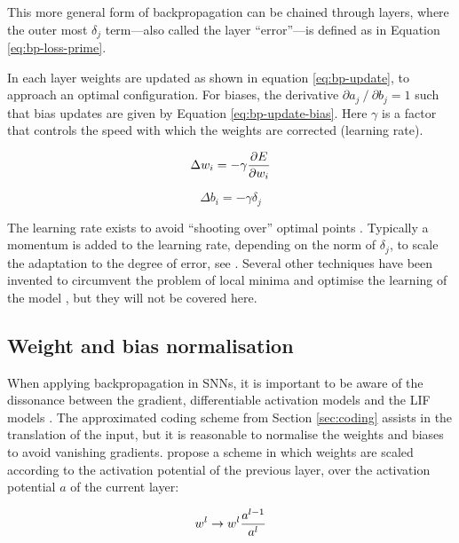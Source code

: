 \documentclass[report.tex]{subfiles}
\begin{document}
This more general form of backpropagation can be chained through layers, where
the outer most $\delta_j$ term---also called the layer ``error''---is defined 
as in Equation \ref{eq:bp-loss-prime}.

In each layer weights are updated as shown in equation \ref{eq:bp-update},
to approach an optimal configuration.
For biases, the derivative $\partial a_j \mathbin{/} \partial b_j = 1$ such that bias
updates are given by Equation \ref{eq:bp-update-bias}.
Here $\gamma$ is a factor that controls the speed with which the weights
are corrected (learning rate). 

\begin{equation}
  \Delta w_i = -\gamma {\partial E \over \partial w_i}
  \label{eq:bp-update}
\end{equation}

\begin{equation}
  \Delta b_i = -\gamma \delta_j
  \label{eq:bp-update-bias}
\end{equation}

The learning rate exists to avoid ``shooting over'' optimal points
\cite{Russel2007}.
Typically a momentum is added to the learning rate, depending on the norm of
$\delta_j$, to scale the adaptation to the degree of error,
see \cite{Sutskever2013, LeCun1998}. 
Several other techniques have been invented to circumvent the problem of 
local minima and optimise the learning of the model \cite{LeCun1998,
Schmidhuber2014}, but they will not be covered here.

\subsection{Weight and bias normalisation}
When applying backpropagation in \glspl{SNN}, it is important to be aware of the dissonance
between the gradient, differentiable activation models and the LIF models
\cite{Diehl2015, Rueckauer2017}.
The approximated coding scheme from Section \ref{sec:coding} assists in the translation
of the input, but it is reasonable to normalise the weights and biases to avoid vanishing gradients.
\textcite{Rueckauer2017} propose a scheme in which weights are scaled according to the activation
potential of the previous layer, over the activation potential $a$ of	 the current layer:

\begin{equation}
w^l \rightarrow w^l {a^{l - 1} \over a^l}
\label{eq:weight_norm}
\end{equation}
\end{document}
